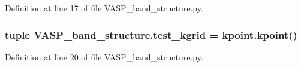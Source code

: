 Definition at line 17 of file V\+A\+S\+P\+\_\+band\+\_\+structure.\+py.

\hypertarget{namespace_v_a_s_p__band__structure_a54971948e7b7b36e4afa8e29894a9a87}{
\subsubsection[{test\+\_\+kgrid}]{\setlength{\rightskip}{0pt plus 5cm}tuple V\+A\+S\+P\+\_\+band\+\_\+structure.\+test\+\_\+kgrid = kpoint.\+kpoint()}}\label{namespace_v_a_s_p__band__structure_a54971948e7b7b36e4afa8e29894a9a87}


Definition at line 20 of file V\+A\+S\+P\+\_\+band\+\_\+structure.\+py.

